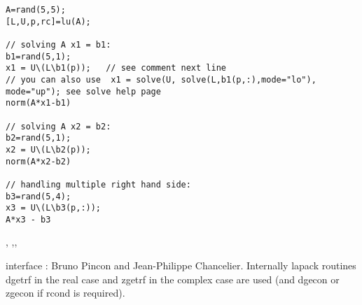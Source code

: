 \begin{examples}
\begin{Verbatim}
A=rand(5,5);
[L,U,p,rc]=lu(A);

// solving A x1 = b1:
b1=rand(5,1);
x1 = U\(L\b1(p));   // see comment next line 
// you can also use  x1 = solve(U, solve(L,b1(p,:),mode="lo"), mode="up"); see solve help page
norm(A*x1-b1)
    
// solving A x2 = b2:
b2=rand(5,1);
x2 = U\(L\b2(p));
norm(A*x2-b2)
    
// handling multiple right hand side:
b3=rand(5,4);
x3 = U\(L\b3(p,:));
A*x3 - b3
\end{Verbatim}
\end{examples}

\begin{manseealso}
  , ,,
\end{manseealso}

\begin{authors}
   interface : Bruno Pincon and Jean-Philippe Chancelier. Internally lapack routines dgetrf in the
   real case and zgetrf in the complex case are used (and dgecon or zgecon if
   rcond is required).
\end{authors}
